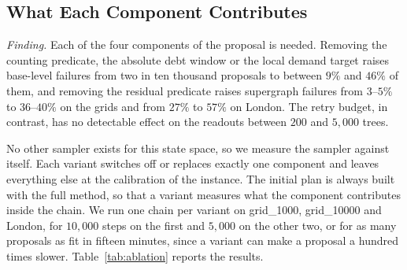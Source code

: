 \begin{table}[!htbp]
\centering
\small

\caption{Rejected proposals by cause, as shares of all proposals: the scaling sweep on the grids (one chain of $10{,}000$ steps each) and the four London chains pooled. The four causes are defined in Section~\ref{sec:feasibility}.}
\label{tab:rejections}
\end{table}

\subsection{What Each Component Contributes}\label{sec:exp-ablation}

\emph{Finding.} Each of the four components of the proposal is needed. Removing the counting predicate, the absolute debt window or the local demand target raises base-level failures from two in ten thousand proposals to between $9\%$ and $46\%$ of them, and removing the residual predicate raises supergraph failures from $3$--$5\%$ to $36$--$40\%$ on the grids and from $27\%$ to $57\%$ on London. The retry budget, in contrast, has no detectable effect on the readouts between $200$ and $5{,}000$ trees.

No other sampler exists for this state space, so we measure the sampler against itself. Each variant switches off or replaces exactly one component and leaves everything else at the calibration of the instance. The initial plan is always built with the full method, so that a variant measures what the component contributes inside the chain. We run one chain per variant on grid\_1000, grid\_10000 and London, for $10{,}000$ steps on the first and $5{,}000$ on the other two, or for as many proposals as fit in fifteen minutes, since a variant can make a proposal a hundred times slower. Table~\ref{tab:ablation} reports the results.

\begin{table}[!htbp]
\centering
\small\setlength{\tabcolsep}{4pt}
\resizebox{\linewidth}{!}{}
\caption{Component ablations: one chain per variant and instance. ``Accepted'' is the share of proposals that close. ``Base'' and ``supergr.''\ are the shares of proposals rejected because the level-1 recursion or the supergraph recursion exhausted its retry budget; the remaining rejections are re-cuts that would leave a superdistrict with fewer than $\kappa^2_{\min}$ districts. Variants that reached the fifteen-minute cap made fewer proposals than the full method: without the counting predicate, with the scaled window and with the global target, $2{,}194$, $1{,}262$ and $490$ on grid\_1000 and $995$, $755$ and $182$ on grid\_10000, and $2{,}405$ with the global target on London.}
\label{tab:ablation}
\end{table}

